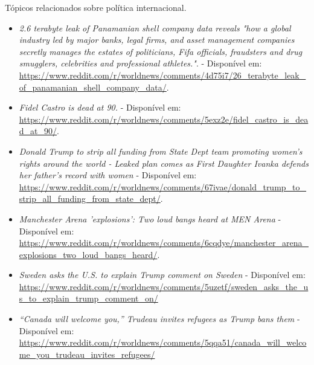 Tópicos relacionados sobre política internacional.
\begin{itemize}
  \item
  \textit{2.6 terabyte leak of Panamanian shell company data reveals "how a
  global industry led by major banks, legal firms, and asset management companies
  secretly manages the estates of politicians, Fifa officials, fraudsters and
  drug smugglers, celebrities and professional
  athletes."}. - Disponível em: \url{https://www.reddit.com/r/worldnews/comments/4d75i7/26_terabyte_leak_of_panamanian_shell_company_data/}.
  \item
  \textit{Fidel Castro is dead at
  90.} - Disponível em: \url{https://www.reddit.com/r/worldnews/comments/5exz2e/fidel_castro_is_dead_at_90/}.
  
  \item
  \textit{Donald Trump to strip all funding from State Dept team promoting women's rights around the world - Leaked plan comes as First Daughter Ivanka defends her father's record with women} - Disponível em: \url{https://www.reddit.com/r/worldnews/comments/67ivae/donald_trump_to_strip_all_funding_from_state_dept/}.
  
  \item
  \textit{Manchester Arena 'explosions': Two loud bangs heard at MEN Arena} - Disponível em: \url{https://www.reddit.com/r/worldnews/comments/6cqdye/manchester_arena_explosions_two_loud_bangs_heard/}.
  
  \item
  \textit{Sweden asks the U.S. to explain Trump comment on
  Sweden} - Disponível em: \url{https://www.reddit.com/r/worldnews/comments/5uzetf/sweden_asks_the_us_to_explain_trump_comment_on/}
  
  \item\textit{“Canada will welcome you,” Trudeau invites refugees as Trump bans
  them} - Disponível em: \url{https://www.reddit.com/r/worldnews/comments/5qqa51/canada_will_welcome_you_trudeau_invites_refugees/}
\end{itemize}

